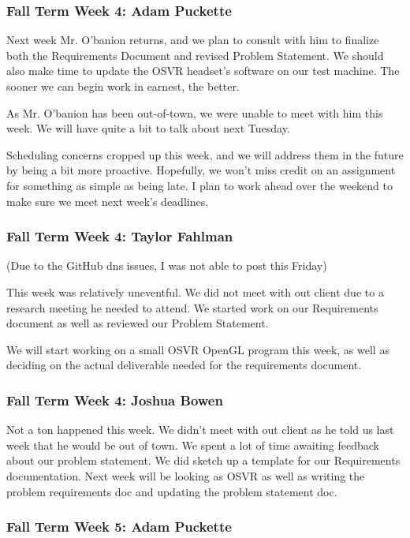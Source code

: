 \documentclass[draftclsnofoot,onecolumn]{IEEEtran}
\begin{document}
\subsubsection{Fall Term Week 4: Adam Puckette}

Next week Mr. O'banion returns, and we plan to consult with him to finalize both the Requirements Document and revised Problem Statement. We should also make time to update the OSVR headset's software on our test machine. The sooner we can begin work in earnest, the better.

As Mr. O'banion has been out-of-town, we were unable to meet with him this week. We will have quite a bit to talk about next Tuesday.

Scheduling concerns cropped up this week, and we will address them in the future by being a bit more proactive. Hopefully, we won't miss credit on an assignment for something as simple as being late. I plan to work ahead over the weekend to make sure we meet next week's deadlines.

\subsubsection{Fall Term Week 4: Taylor Fahlman}

(Due to the GitHub dns issues, I was not able to post this Friday)

This week was relatively uneventful. We did not meet with out client due to a research meeting he needed to attend. We started work on our Requirements document as well as reviewed our Problem Statement.

We will start working on a small OSVR OpenGL program this week, as well as deciding on the actual deliverable needed for the requirements document.

\subsubsection{Fall Term Week 4: Joshua Bowen}

Not a ton happened this week. We didn't meet with out client as he told us last week that he would be out of town. We spent a lot of time awaiting feedback about our problem statement. We did sketch up a template for our Requirements documentation. Next week will be looking as OSVR as well as writing the problem requirements doc and updating the problem statement doc.

\subsubsection{Fall Term Week 5: Adam Puckette}
\end{document}
